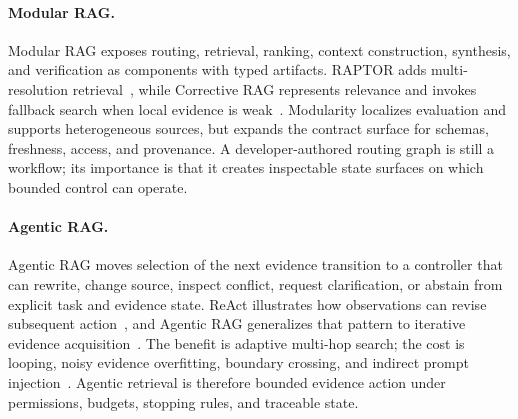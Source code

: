 \paragraph{Modular RAG.}
Modular RAG exposes routing, retrieval, ranking, context construction, synthesis, and verification as components with typed artifacts. RAPTOR adds multi-resolution retrieval~\cite{sarthi2024raptor}, while Corrective RAG represents relevance and invokes fallback search when local evidence is weak~\cite{yan2024crag}. Modularity localizes evaluation and supports heterogeneous sources, but expands the contract surface for schemas, freshness, access, and provenance. A developer-authored routing graph is still a workflow; its importance is that it creates inspectable state surfaces on which bounded control can operate.

\paragraph{Agentic RAG.}
Agentic RAG moves selection of the next evidence transition to a controller that can rewrite, change source, inspect conflict, request clarification, or abstain from explicit task and evidence state. ReAct illustrates how observations can revise subsequent action~\cite{yao2023react}, and Agentic RAG generalizes that pattern to iterative evidence acquisition~\cite{singh2025agenticragsurvey}. The benefit is adaptive multi-hop search; the cost is looping, noisy evidence overfitting, boundary crossing, and indirect prompt injection~\cite{greshake2023promptinjection}. Agentic retrieval is therefore bounded evidence action under permissions, budgets, stopping rules, and traceable state.

